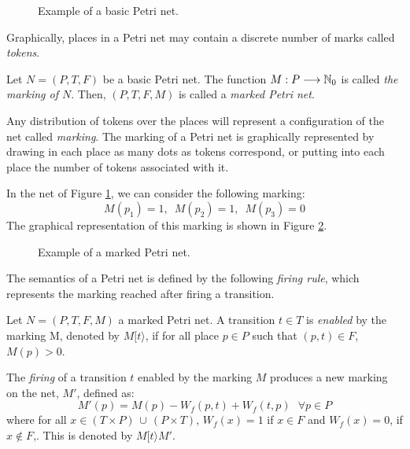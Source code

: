 \begin{figure}

\caption{\label{fig201} Example of a basic Petri net.}
\end{figure}

Graphically, places in a Petri net may contain a discrete number of marks called \emph{tokens}. 

\begin{definition} 
Let $N=(P,T,F)$ be a basic Petri net.
The function $M: P \longrightarrow
\mathbb{N}_{0}$ is called {\it the marking of $N$}. Then,
$(P,T,F,M)$ is called a {\it marked Petri net}.
\end{definition}

Any distribution of tokens over the places will represent a configuration of the net called \emph{marking}.
The marking of a Petri net is graphically represented by drawing
in each place as many dots as tokens correspond,
or putting into each place the number of tokens associated with it. 


\begin{example} In the net of Figure \ref{fig201}, we can consider the following marking:
\[ M(p_1) = 1,\,\,\,M(p_2)=1,\,\,\,M(p_3)=0 \]
The graphical representation of this marking is shown in Figure \ref{fig202}.
\end{example}

\begin{figure}

\caption{\label{fig202} Example of a marked Petri net.}
\end{figure}

The semantics of a Petri net is defined by the following \emph{firing rule}, which
represents the marking reached after firing a transition.

\begin{definition}
Let $N=(P,T,F,M)$ a marked Petri net. A transition $t \in T$
is {\it enabled} by the marking M, denoted by $M[t\rangle$, if for all place
$p \in P$ such that $(p,t) \in F$, $M(p) > 0$.
\end{definition}

\begin{definition}
The \emph{firing} of a transition $t$ enabled by the marking $M$
produces a new marking on the net, $M'$, defined as:
\[M'(p) = M(p) - W_f(p,t) + W_f(t,p)~~~\forall p \in P\]
where for all $x \in (T \times P) \, \cup \, (P \times T)$,  
$W_f(x) = 1$ if $x \in F$ and $W_f(x) = 0$, if $x \not\in F$,.
This is denoted by $M[t\rangle M'$.
\end{definition}

